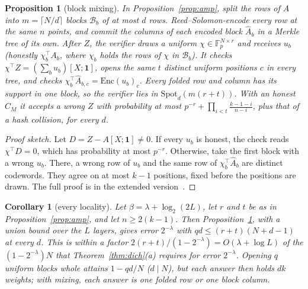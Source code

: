 \documentclass[conference,compsoc]{IEEEtran}
\newcommand{\T}{\top}
\newcommand{\F}{\mathbb{F}_p}
\newcommand{\enc}{\mathrm{Enc}}
\theoremstyle{plain}
\newtheorem{corollary}{Corollary}
\newtheorem{proposition}{Proposition}
\theoremstyle{definition}
\theoremstyle{remark}
\begin{document}
\begin{proposition}[block mixing]
\label{prop:block}
In Proposition~\ref{prop:amp}, split the rows of $A$ into $m=\lceil N/d\rceil$ blocks $\mathcal B_b$
of at most $d$ rows. Reed--Solomon-encode every row at the same $n$ points, and commit the columns of
each encoded block $\hat A_b$ in a Merkle tree of its own. After $Z$, the verifier draws a uniform
$\chi\in\F^{N\times r}$ and receives $u_b$ (honestly $\chi_b^\T A_b$, where $\chi_b$ holds the rows of
$\chi$ in $\mathcal B_b$). It checks $\chi^\T Z=(\sum_bu_b)[X;\mathbf 1]$, opens the same $t$
distinct uniform positions $c$ in every tree, and checks $\chi_b^\T\hat A_{b,c}=\enc(u_b)_c$. Every
folded row and column has its support in one block, so the verifier lies in
$\mathrm{Spot}_d(m(r+t))$. With an honest $C_M$ it accepts a wrong $Z$ with probability at most
$p^{-r}+\prod_{i<t}\frac{k-1-i}{n-i}$, plus that of a hash collision, for every $d$.
\end{proposition}
\begin{proof}[Proof sketch]
Let $D=Z-A[X;\mathbf 1]\neq0$. If every $u_b$ is honest, the check reads $\chi^\T D=0$, which has
probability at most $p^{-r}$. Otherwise, take the first block with a wrong $u_b$. There, a wrong row of
$u_b$ and the same row of $\chi_b^\T\hat A_b$ are distinct codewords. They agree on at most $k-1$
positions, fixed before the positions are drawn. The full proof is in the extended
version~\cite{fullversion}.
\end{proof}

\begin{corollary}[every locality]
\label{cor:block}
Let $\beta=\lambda+\log_2(2L)$, let $r$ and $t$ be as in Proposition~\ref{prop:amp}, and let
$n\ge2(k-1)$. Then Proposition~\ref{prop:block}, with a union bound over the $L$ layers, gives error
$2^{-\lambda}$ with $qd\le(r+t)(N+d-1)$ at every $d$. This is within a factor
$2(r+t)/(1-2^{-\lambda})=O(\lambda+\log L)$ of the $(1-2^{-\lambda})N$ that
Theorem~\ref{thm:dich}(a) requires for error $2^{-\lambda}$. Opening $q$ uniform blocks whole attains
$1-qd/N$ ($d\mid N$), but each answer then holds $dk$ weights; with mixing, each answer is one folded
row or one block column.
\end{corollary}
\end{document}
